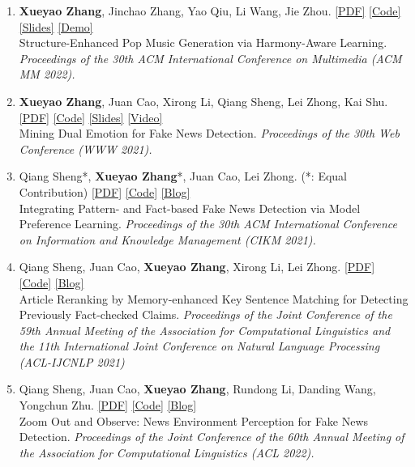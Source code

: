 \documentclass{resume}
\begin{document}
\begin{enumerate}\itemsep 0.5em
  \item \textbf{Xueyao Zhang}, Jinchao Zhang, Yao Qiu, Li Wang, Jie Zhou. \href{https://dl.acm.org/doi/10.1145/3503161.3548084}{[PDF]} \href{https://github.com/RMSnow/HAT}{[Code]} \href{https://www.zhangxueyao.com/data/HAT/slides.pdf}{[Slides]} \href{https://www.zhangxueyao.com/data/HAT/demo.html}{[Demo]}\\Structure-Enhanced Pop Music Generation via Harmony-Aware Learning. \textit{Proceedings of the 30th ACM International Conference on Multimedia (ACM MM 2022).}
  \item \textbf{Xueyao Zhang}, Juan Cao, Xirong Li, Qiang Sheng, Lei Zhong, Kai Shu. \href{https://dl.acm.org/doi/pdf/10.1145/3442381.3450004}{[PDF]} \href{https://github.com/RMSnow/WWW2021}{[Code]} \href{https://www.zhangxueyao.com/assets/www2021-dual-emotion-slides.pdf}{[Slides]} \href{https://www.bilibili.com/video/BV13o4y1m7c3}{[Video]}\\ Mining Dual Emotion for Fake News Detection. \textit{Proceedings of the 30th Web Conference (WWW 2021).}
  \item Qiang Sheng*, \textbf{Xueyao Zhang}*, Juan Cao, Lei Zhong. (*: Equal
        Contribution) \href{https://dl.acm.org/doi/10.1145/3459637.3482440}{[PDF]}
        \href{https://github.com/ICTMCG/Pref-FEND}{[Code]}
        \href{https://zhuanlan.zhihu.com/p/414464291}{[Blog]}\\Integrating Pattern- and
        Fact-based Fake News Detection via Model Preference Learning.
        \textit{Proceedings of the 30th ACM International Conference on Information and
          Knowledge Management (CIKM 2021).}
  \item Qiang Sheng, Juan Cao, \textbf{Xueyao Zhang}, Xirong Li, Lei Zhong.
        \href{https://aclanthology.org/2021.acl-long.425.pdf}{[PDF]}
        \href{https://github.com/ICTMCG/MTM}{[Code]}
        \href{https://zhuanlan.zhihu.com/p/393615707}{[Blog]}\\Article Reranking by
        Memory-enhanced Key Sentence Matching for Detecting Previously Fact-checked
        Claims. \textit{Proceedings of the Joint Conference of the 59th Annual Meeting
          of the Association for Computational Linguistics and the 11th International
          Joint Conference on Natural Language Processing (ACL-IJCNLP 2021) }
  \item Qiang Sheng, Juan Cao, \textbf{Xueyao Zhang}, Rundong Li, Danding Wang,
        Yongchun Zhu. \href{https://aclanthology.org/2022.acl-long.311.pdf}{[PDF]}
        \href{https://github.com/ICTMCG/News-Environment-Perception}{[Code]}
        \href{https://mp.weixin.qq.com/s/aTFeuCYIpSoazeRi52jqew}{[Blog]}\\Zoom Out and
        Observe: News Environment Perception for Fake News Detection.
        \textit{Proceedings of the Joint Conference of the 60th Annual Meeting of the
          Association for Computational Linguistics (ACL 2022).}
\end{enumerate}
\end{document}
